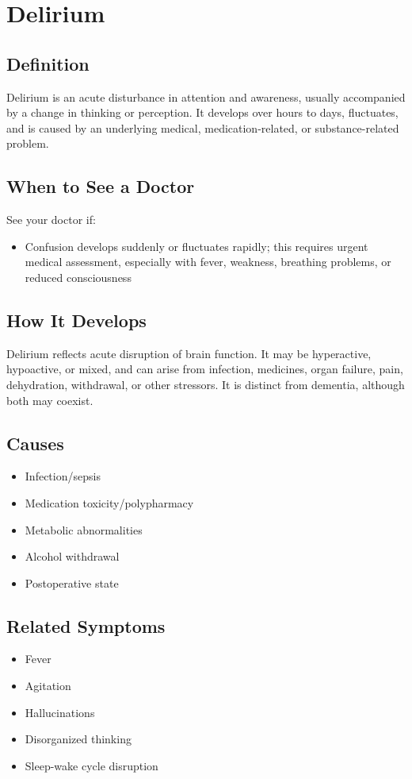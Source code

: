 \chapter{Delirium}

\section*{Definition}
Delirium is an acute disturbance in attention and awareness, usually accompanied by a change in thinking or perception. It develops over hours to days, fluctuates, and is caused by an underlying medical, medication-related, or substance-related problem.

\section*{When to See a Doctor}
See your doctor if:
\begin{itemize}
  \item Confusion develops suddenly or fluctuates rapidly; this requires urgent medical assessment, especially with fever, weakness, breathing problems, or reduced consciousness
\end{itemize}

\section*{How It Develops}
Delirium reflects acute disruption of brain function. It may be hyperactive, hypoactive, or mixed, and can arise from infection, medicines, organ failure, pain, dehydration, withdrawal, or other stressors. It is distinct from dementia, although both may coexist.

\section*{Causes}
\begin{itemize}
  \item Infection/sepsis
  \item Medication toxicity/polypharmacy
  \item Metabolic abnormalities
  \item Alcohol withdrawal
  \item Postoperative state
\end{itemize}

\section*{Related Symptoms}
\begin{itemize}
  \item Fever
  \item Agitation
  \item Hallucinations
  \item Disorganized thinking
  \item Sleep-wake cycle disruption
\end{itemize}


